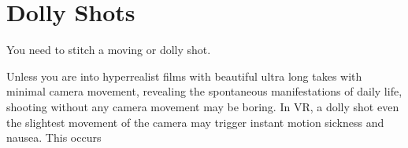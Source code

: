 \chapter{Dolly Shots}
\pagecolor{white}
\label{chap:45}
\begin{fullwidth}

\problem

{\large You need to stitch a moving or dolly shot. \par}

Unless you are into hyperrealist films with beautiful ultra long takes with minimal camera movement, revealing the spontaneous manifestations of daily life, shooting without any camera movement may be boring. In VR, a dolly shot even the slightest movement of the camera may trigger instant motion sickness and nausea. This occurs

\solution


\clearpage
\end{fullwidth}
